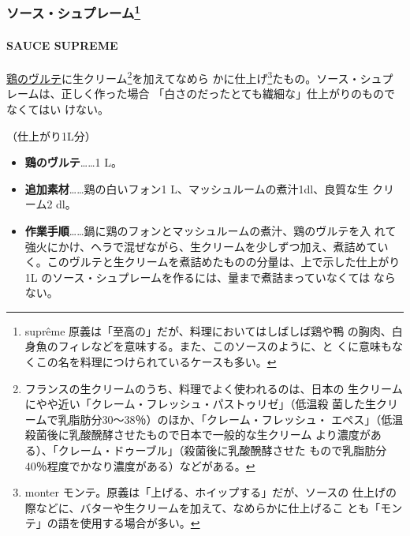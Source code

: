 \begin{recette}
{\subsubsection[ソース・シュプレーム]{\texorpdfstring{ソース・シュプレーム\footnote{suprême
  原義は「至高の」だが、料理においてはしばしば鶏や鴨
  の胸肉、白身魚のフィレなどを意味する。また、このソースのように、と
  くに意味もなくこの名を料理につけられているケースも多い。}}{ソース・シュプレーム}}\label{ux30bdux30fcux30b9ux30b7ux30e5ux30d7ux30ecux30fcux30e0102023}}

\hypertarget{sauce-supreme}{%
\paragraph{SAUCE SUPREME}\label{sauce-supreme}}

 

\protect\hyperlink{veloute-de-volaille}{鶏のヴルテ}に生クリーム\footnote{フランスの生クリームのうち、料理でよく使われるのは、日本の
  生クリームにやや近い「クレーム・フレッシュ・パストゥリゼ」（低温殺
  菌した生クリームで乳脂肪分30〜38％）のほか、「クレーム・フレッシュ・
  エペス」（低温殺菌後に乳酸醗酵させたもので日本で一般的な生クリーム
  より濃度がある）、「クレーム・ドゥーブル」（殺菌後に乳酸醗酵させた
  もので乳脂肪分40％程度でかなり濃度がある）などがある。}を加えてなめら
かに仕上げ\footnote{monter
  モンテ。原義は「上げる、ホイップする」だが、ソースの
  仕上げの際などに、バターや生クリームを加えて、なめらかに仕上げるこ
  とも「モンテ」の語を使用する場合が多い。}たもの。ソース・シュプレームは、正しく作った場合
「白さのだったとても繊細な」仕上がりのものでなくてはい
けない。

（仕上がり1L分）

\begin{itemize}
\item
  \textbf{鶏のヴルテ}\ldots{}\ldots{}1 L。
\item
  \textbf{追加素材}\ldots{}\ldots{}鶏の白いフォン1
  L、マッシュルームの煮汁1dl、良質な生 クリーム2 \undemi{} dl。
\item
  \textbf{作業手順}\ldots{}\ldots{}鍋に鶏のフォンとマッシュルームの煮汁、鶏のヴルテを入
  れて強火にかけ、ヘラで混ぜながら、生クリームを少しずつ加え、煮詰めてい
  く。このヴルテと生クリームを煮詰めたものの分量は、上で示した仕上がり1L
  のソース・シュプレームを作るには、\untiers{}量まで煮詰まっていなくては
  ならない。
\end{itemize}


\end{recette}
